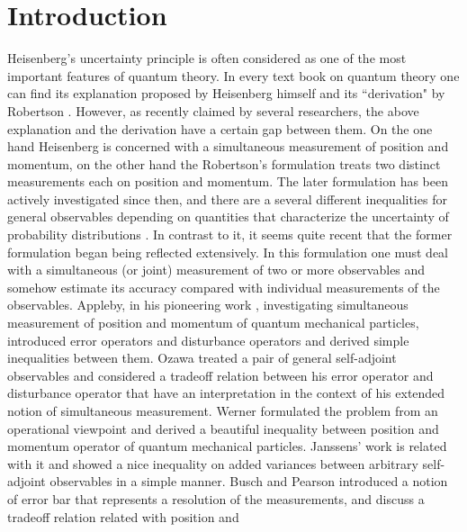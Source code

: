\documentclass[12pt,showpacs,preprintnumbers,amsmath,amssymb]{revtex4-2}
\begin{document}
\section{Introduction}
Heisenberg's uncertainty principle is often considered as 
one of the most important features of quantum theory. 
In every text book on quantum theory one can find 
its explanation proposed by 
Heisenberg himself \cite{Heisenberg} 
and its ``derivation" by Robertson \cite{Robertson}.  
However, as recently claimed by several researchers, 
the above explanation and the derivation have 
a certain gap between them. On the one hand 
Heisenberg is concerned with a simultaneous measurement
of position and momentum, on the other hand the Robertson's
formulation treats two distinct measurements each on position and 
momentum. 
The later formulation has been actively investigated 
since then, and there are a several different inequalities
for general observables 
depending on quantities that characterize the 
uncertainty of probability distributions
\cite{LP,Deutsch,Maassen,KP,Miyadera}.  
In contrast to it, it seems quite recent that 
the former formulation began being
reflected extensively. In this formulation
one must deal with a simultaneous (or joint) measurement of two 
or more observables and somehow estimate its 
accuracy compared with 
individual measurements of the observables. 
Appleby, in his pioneering work \cite{Appleby}, 
investigating simultaneous measurement of 
position and momentum of quantum mechanical particles, 
introduced error operators 
and disturbance operators and derived 
simple inequalities between them. 
 Ozawa \cite{Ozawa} treated a pair of general 
 self-adjoint observables and 
 considered a tradeoff relation between his 
 error operator and disturbance operator that have 
 an interpretation in the context of his extended notion of 
 simultaneous measurement. 
 Werner \cite{Werner} formulated the problem from an operational viewpoint 
 and derived a beautiful inequality between 
 position and momentum operator of quantum mechanical particles.
 Janssens' work \cite{Janssens} is related with it and 
 showed a nice inequality on added variances 
 between arbitrary 
 self-adjoint observables in a simple manner.   
 Busch and Pearson \cite{errorbar} introduced a notion of 
 error bar that represents a resolution of the measurements, and 
 discuss a tradeoff relation related with position and 
\end{document}
